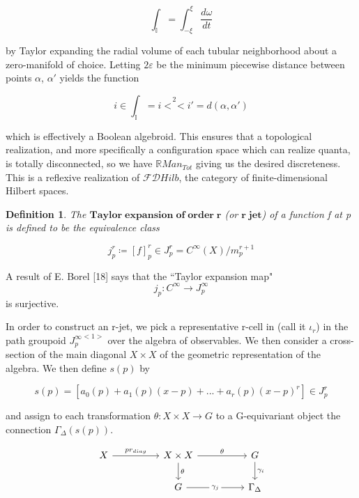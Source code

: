 \documentclass{article}
\newtheorem{dn}{Definition}
\begin{document}
		$$\int_\mathbb{I}=\int_{-\xi}^{\xi} \frac{d\omega}{dt}$$
		
		by Taylor expanding the radial volume of each tubular neighborhood about a zero-manifold of choice. Letting $2\varepsilon$ be the minimum piecewise distance between points $\alpha$, $\alpha'$ yields the function
		
		$$i \in \int_\mathbb{I} = i \overset{2}{<<}i' = d(\alpha,\alpha')$$
		
		which is effectively a Boolean algebroid. This ensures that a topological realization, and more specifically a configuration space which can realize quanta, is totally disconnected, so we have $\mathbb{R}Man_{Tot}$ giving us the desired discreteness. This is a reflexive realization of $\mathcal{F}\mathcal{D}Hilb$, the category of finite-dimensional Hilbert spaces.
		
		\begin{dn}
			The $\mathbf{Taylor\;expansion\;of\;order\;r}$ (or $\mathbf{r \; jet}$) of a function f at p is defined to be the equivalence class
			
			$$j_p^r \coloneq [f]_p^r \in J_p^r = C^\infty(X)/m_p^{r+1}$$
		\end{dn}
		
		A result of E. Borel [18] says that the ``Taylor expansion map"
		$$j_p:C^\infty \to J_p^\infty$$
		is surjective.
		
			In order to construct an r-jet, we pick a representative r-cell in (call it $\iota_r$) in the path groupoid ${J_p^\infty}^{<1>}$ over the algebra of observables. We then consider a cross-section of the main diagonal $X \times X$ of the geometric representation of the algebra. We then define $s(p)$ by
			
			$$s(p) = [a_0(p) + a_1(p)(x-p) + ... + a_r(p)(x-p)^r] \in J_p^r$$
			
			and assign to each transformation $\theta: X\times X \longrightarrow G$ to a G-equivariant object the connection $\Gamma_\Delta(s(p))$.
			
		\[\begin{tikzcd}
			X && {X\times X} && G \\
			&& G && {\Gamma_\Delta}
			\arrow["{pr_{diag}}", from=1-1, to=1-3]
			\arrow["\theta", from=1-3, to=1-5]
			\arrow["{\gamma_i}", from=1-5, to=2-5]
			\arrow["\theta", from=1-3, to=2-3]
			\arrow["{\gamma_j}"{description}, from=2-3, to=2-5]
		\end{tikzcd}\]
		
\end{document}
